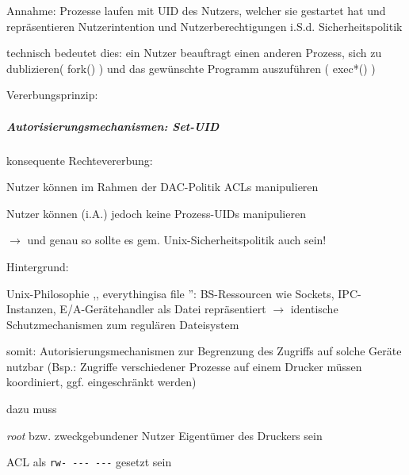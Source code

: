 \documentclass[a4paper]{article}
\begin{document}
\begin{multicols}{3}
    \begin{itemize*}
        \item
        Annahme: Prozesse laufen mit UID des Nutzers, welcher sie gestartet
        hat und repräsentieren Nutzerintention und Nutzerberechtigungen i.S.d.
        Sicherheitspolitik
        \item
        technisch bedeutet dies: ein Nutzer beauftragt einen anderen Prozess,
        sich zu dublizieren( fork() ) und das gewünschte Programm auszuführen
        ( exec*() )
        \item
        Vererbungsprinzip:
    \end{itemize*}


    \subparagraph{Autorisierungsmechanismen:
        Set-UID}

    konsequente Rechtevererbung:

    \begin{itemize*}
        \item
        Nutzer können im Rahmen der DAC-Politik ACLs manipulieren
        \item
        Nutzer können (i.A.) jedoch keine Prozess-UIDs manipulieren
        \item
        $\rightarrow$ und genau so sollte es gem.
        Unix-Sicherheitspolitik auch sein!
    \end{itemize*}

    Hintergrund:

    \begin{itemize*}
        \item
        Unix-Philosophie ,, everythingisa file '': BS-Ressourcen wie Sockets,
        IPC-Instanzen, E/A-Gerätehandler als Datei repräsentiert
        $\rightarrow$ identische Schutzmechanismen zum
        regulären Dateisystem
        \item
        somit: Autorisierungsmechanismen zur Begrenzung des Zugriffs auf
        solche Geräte nutzbar (Bsp.: Zugriffe verschiedener Prozesse auf einem
        Drucker müssen koordiniert, ggf. eingeschränkt werden)
        \item
        dazu muss
        \begin{itemize*}
            \item \emph{root} bzw. zweckgebundener Nutzer Eigentümer des Druckers sein
            \item ACL als \texttt{rw-\ -\/-\/-\ -\/-\/-} gesetzt sein
        \end{itemize*}
    \end{itemize*}


\end{multicols}
\end{document}
